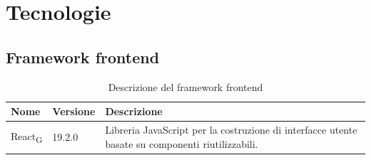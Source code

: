 \documentclass[11pt,a4paper]{article}
\newcommand{\gls}[1]{#1\textsubscript{G}}
\begin{document}
\newpage

\section{Tecnologie}
\subsection{Framework frontend}
\begin{table}[H]
    \centering
    \begin{tabular}{|p{}|p{}|p{}|}
        \hline
        \textbf{Nome} & \textbf{Versione} & \textbf{Descrizione} \\
        \hline
        \gls{React} & 19.2.0 & Libreria JavaScript per la costruzione di interfacce utente basate su componenti riutilizzabili. \\
        \hline
    \end{tabular}
    \caption{Descrizione del framework frontend}
    \label{tab:framework_frontend}
\end{table}
\end{document}
